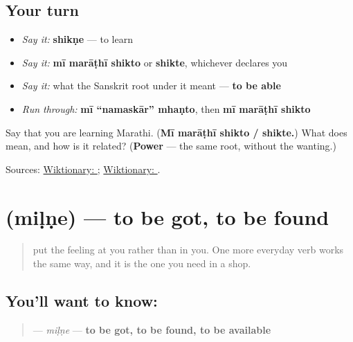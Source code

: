 \subsection*{Your turn}
\begin{itemize}
\raggedright
  \item \emph{Say it:} \textbf{shikṇe} — to learn
  \item \emph{Say it:} \textbf{mī marāṭhī shikto} or \textbf{shikte}, whichever declares you
  \item \emph{Say it:} what the Sanskrit root under it meant — \textbf{to be able}
  \item \emph{Run through:} \textbf{mī \textquotedblleft{}namaskār\textquotedblright{} mhaṇto}, then \textbf{mī marāṭhī shikto}
\end{itemize}

\begin{tcolorbox}[breakable,colback=teal!4,colframe=teal!35!black,title={Before you move on}]
Say that you are learning Marathi. (\textbf{Mī marāṭhī shikto / shikte.}) What does \textbf{} mean, and how is it related? (\textbf{Power} — the same root, without the wanting.)

Sources: \href{https://en.wiktionary.org/wiki/\%E0\%A4\%B6\%E0\%A4\%BF\%E0\%A4\%95\%E0\%A4\%A3\%E0\%A5\%87}{Wiktionary: }; \href{https://en.wiktionary.org/wiki/\%E0\%A4\%B6\%E0\%A4\%95\%E0\%A5\%8D}{Wiktionary: }.
\end{tcolorbox}
\section[\texorpdfstring{\mr{मिळणे} (miḷṇe)}{मिळणे (miḷṇe)}]{ (miḷṇe) — to be got, to be found}

\label{lesson:MR-C24-milne}



\begin{quote}
\textbf{  } put the feeling at you rather than in you. One more everyday verb works the same way, and it is the one you need in a shop.
\end{quote}

\subsection*{You'll want to know: }
\begin{quote}
\textbf{} — \emph{miḷṇe} — \textbf{to be got, to be found, to be available}
\end{quote}

